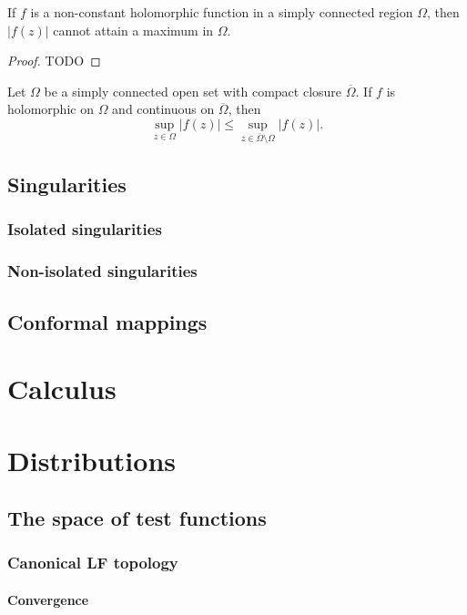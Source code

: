 \begin{proposition}
If $f$ is a non-constant holomorphic function in a simply connected region $\Omega$, then $|f(z)|$ cannot attain a maximum in $\Omega$.
\end{proposition}
\begin{proof}
TODO
\end{proof}
\begin{corollary}
Let $\Omega$ be a simply connected open set with compact closure $\overline{\Omega}$. If $f$ is holomorphic on $\Omega$ and continuous on $\overline{\Omega}$, then
\[ \sup_{z\in \Omega}|f(z)| \leq \sup_{z\in \overline{\Omega}\setminus\Omega}|f(z)|. \]
\end{corollary}

\section{Singularities}
\subsection{Isolated singularities}

\subsection{Non-isolated singularities}

\section{Conformal mappings}

\chapter{Calculus}



\chapter{Distributions}
\section{The space of test functions}
\subsection{Canonical LF topology}
\subsubsection{Convergence}
